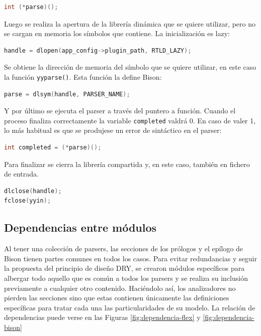 \begin{lstlisting}[language=C,caption={},label={}]
int (*parse)();
\end{lstlisting}

Luego se realiza la apertura de la librería dinámica que se quiere utilizar, pero no se cargan en memoria los símbolos que contiene. La inicialización es lazy:

\begin{lstlisting}[language=C,caption={},label={}]
handle = dlopen(app_config->plugin_path, RTLD_LAZY);
\end{lstlisting}

Se obtiene la dirección de memoria del símbolo que se quiere utilizar, en este caso la función \verb|yyparse()|. Esta función la define Bison:

\begin{lstlisting}[language=C,caption={},label={}]
parse = dlsym(handle, PARSER_NAME);
\end{lstlisting}

Y por último se ejecuta el parser a través del puntero a función. Cuando el proceso finaliza correctamente la variable \verb|completed| valdrá 0. En caso de valer 1, lo más habitual es que se produjese un error de sintáctico en el parser:

\begin{lstlisting}[language=C,caption={},label={}]
int completed = (*parse)();
\end{lstlisting}

Para finalizar se cierra la librería compartida y, en este caso, también en fichero de entrada.

\begin{lstlisting}[language=C,caption={},label={}]
dlclose(handle);
fclose(yyin);
\end{lstlisting}

\subsection{Dependencias entre módulos}

Al tener una colección de parsers, las secciones de los prólogos y el epílogo de Bison tienen partes comunes en todos los casos. Para evitar redundancias y seguir la propuesta del principio de diseño DRY, se crearon módulos específicos para albergar todo aquello que es común a todos los parsers y se realiza su inclusión previamente a cualquier otro contenido. Haciéndolo así, los analizadores no pierden las secciones sino que estas contienen únicamente las definiciones específicas para tratar cada una las particularidades de su modelo. La relación de dependencias puede verse en las Figuras \ref{fig:dependencia-flex} y \ref{fig:dependencia-bison}

